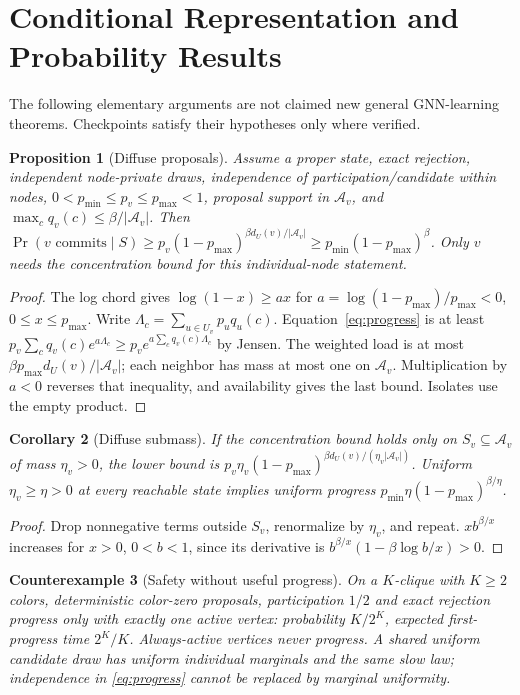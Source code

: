 \documentclass[10pt]{article}
\newtheorem{proposition}{Proposition}
\newtheorem{corollary}[proposition]{Corollary}
\newtheorem{example}[proposition]{Counterexample}
\newcommand{\A}{\mathcal A}
\begin{document}
\section{Conditional Representation and Probability Results}\label{app:math}
The following elementary arguments are not claimed new general GNN-learning
theorems. Checkpoints satisfy their hypotheses only where verified.
\begin{proposition}[Diffuse proposals]
Assume a proper state, exact rejection, independent node-private draws,
independence of participation/candidate within nodes,
$0<p_{\min}\le p_v\le p_{\max}<1$, proposal support in $\A_v$, and
$\max_cq_v(c)\le\beta/|\A_v|$. Then
$\Pr(v\text{ commits}\mid S)\ge
p_v(1-p_{\max})^{\beta d_U(v)/|\A_v|}
\ge p_{\min}(1-p_{\max})^\beta$.
Only $v$ needs the concentration bound for this individual-node statement.
\end{proposition}
\begin{proof}
The log chord gives $\log(1-x)\ge ax$ for
$a=\log(1-p_{\max})/p_{\max}<0$, $0\le x\le p_{\max}$.
Write $\Lambda_c=\sum_{u\in U_v}p_uq_u(c)$.
Equation~\eqref{eq:progress} is at least
$p_v\sum_cq_v(c)e^{a\Lambda_c}\ge p_ve^{a\sum_cq_v(c)\Lambda_c}$ by Jensen.
The weighted load is at most $\beta p_{\max}d_U(v)/|\A_v|$; each neighbor
has mass at most one on $\A_v$. Multiplication by $a<0$ reverses that
inequality, and availability gives the last bound. Isolates use the empty
product.
\end{proof}
\begin{corollary}[Diffuse submass]
If the concentration bound holds only on $S_v\subseteq\A_v$ of mass
$\eta_v>0$, the lower bound is
$p_v\eta_v(1-p_{\max})^{\beta d_U(v)/(\eta_v|\A_v|)}$.
Uniform $\eta_v\ge\eta>0$ at every reachable state implies uniform progress
$p_{\min}\eta(1-p_{\max})^{\beta/\eta}$.
\end{corollary}
\begin{proof}
Drop nonnegative terms outside $S_v$, renormalize by $\eta_v$, and repeat.
$x b^{\beta/x}$ increases for $x>0$, $0<b<1$, since its derivative is
$b^{\beta/x}(1-\beta\log b/x)>0$.
\end{proof}
\begin{example}[Safety without useful progress]
On a $K$-clique with $K\ge2$ colors, deterministic color-zero proposals,
participation $1/2$ and exact rejection progress only with exactly one active
vertex: probability $K/2^K$, expected first-progress time $2^K/K$.
Always-active vertices never progress. A shared uniform candidate draw has
uniform individual marginals and the same slow law; independence in
\eqref{eq:progress} cannot be replaced by marginal uniformity.
\end{example}
\end{document}
